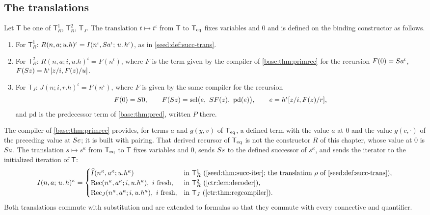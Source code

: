 \subsection{The translations}

\begin{definition}[Translations]\label{ctr:def:translations}
Let $\mathsf T$ be one of $\mathsf T_R^1$, $\mathsf T_R^2$, $\mathsf T_J$. The translation
$t\mapsto t^\iota$ from $\mathsf T$ to $\mathsf{T}_{\mathrm{eq}}$ fixes variables and $0$ and is defined on the
binding constructor as follows.
\begin{enumerate}
\item For $\mathsf T_R^1$: $R(n,a;u.h)^\iota=I(n^\iota,S a^\iota;\,u.\,h^\iota)$, as in
\cref{seed:def:succ-trans}.
\item For $\mathsf T_R^2$: $R(n,a;i,u.h)^\iota=F(n^\iota)$, where $F$ is the term given by
the compiler of \cref{base:thm:primrec} for the recursion
$F(0)=S a^\iota$, $F(S z)=h^\iota[z/i,F(z)/u]$.
\item For $\mathsf T_J$: $J(n;i,r.h)^\iota=F(n^\iota)$, where $F$ is given by the same
compiler for the recursion
\[
 F(0)=S 0,\qquad F(S z)=\operatorname{sel}\bigl(e,\ S F(z),\ \mathrm{pd}(e)\bigr),\qquad
 e=h^\iota[z/i,F(z)/r],
\]
and $\mathrm{pd}$ is the predecessor term of \cref{base:thm:pred}, written $P$ there.
\end{enumerate}
The compiler of \cref{base:thm:primrec} provides, for terms $a$ and $g(y,v)$ of $\mathsf{T}_{\mathrm{eq}}$, a
defined term with the value $a$ at $0$ and the value $g(c,\cdot)$ of the preceding value at
$S c$; it is built with pairing. That derived recursor of $\mathsf{T}_{\mathrm{eq}}$ is not the constructor
$R$ of this chapter, whose value at $0$ is $S a$.
The translation $s\mapsto s^\kappa$ from $\mathsf{T}_{\mathrm{eq}}$ to $\mathsf T$ fixes variables and $0$, sends
$S s$ to the defined successor of $s^\kappa$, and sends the iterator to the initialized
iteration of $\mathsf T$:
\[
 \It{n}{a}{u}{h}^\kappa=
 \begin{cases}
  \widehat I(n^\kappa,a^\kappa;u.h^\kappa) & \text{in } \mathsf T_R^1
   \text{ (\cref{seed:thm:succ-iter}; the translation $\rho$ of \cref{seed:def:succ-trans})},\\
  \operatorname{Rec}(n^\kappa,a^\kappa;i,u.h^\kappa),\ i \text{ fresh}, & \text{in } \mathsf T_R^2
   \text{ (\cref{ctr:lem:decoder})},\\
  \operatorname{Rec}_J(n^\kappa,a^\kappa;i,u.h^\kappa),\ i \text{ fresh}, & \text{in } \mathsf T_J
   \text{ (\cref{ctr:thm:regcompiler})}.
 \end{cases}
\]
Both translations commute with substitution and are extended to formulas so that they
commute with every connective and quantifier.
\end{definition}


